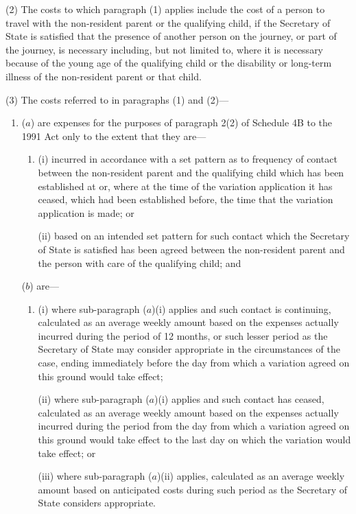 \documentclass[12pt,a4paper]{article}
\begin{document}
(2) The costs to which paragraph (1) applies include the cost of a person to travel with the non-resident parent or the qualifying child, if the Secretary of State is satisfied that the presence of another person on the journey, or part of the journey, is necessary including, but not limited to, where it is necessary because of the young age of the qualifying child or the disability or long-term illness of the non-resident parent or that child.

(3) The costs referred to in paragraphs (1) and (2)—
\begin{enumerate}\item[]
($a$) are expenses for the purposes of paragraph 2(2) of Schedule 4B to the 1991 Act only to the extent that they are—
\begin{enumerate}\item[]
(i) incurred in accordance with a set pattern as to frequency of contact between the non-resident parent and the qualifying child which has been established at or, where at the time of the variation application it has ceased, which had been established before, the time that the variation application is made; or

(ii) based on an intended set pattern for such contact which the Secretary of State is satisfied has been agreed between the non-resident parent and the person with care of the qualifying child; and
\end{enumerate}

($b$) are—
\begin{enumerate}\item[]
(i) where sub-paragraph ($a$)(i)  applies and such contact is continuing, calculated as an average weekly amount based on the expenses actually incurred during the period of 12 months, or such lesser period as the Secretary of State may consider appropriate in the circumstances of the case, ending immediately before the day from which a variation agreed on this ground would take effect;

(ii) where sub-paragraph ($a$)(i)  applies and such contact has ceased, calculated as an average weekly amount based on the expenses actually incurred during the period from the day from which a variation agreed on this ground would take effect to the last day on which the variation would take effect; or

(iii) where sub-paragraph ($a$)(ii)  applies, calculated as an average weekly amount based on anticipated costs during such period as the Secretary of State considers appropriate.
\end{enumerate}
\end{enumerate}
\end{document}
